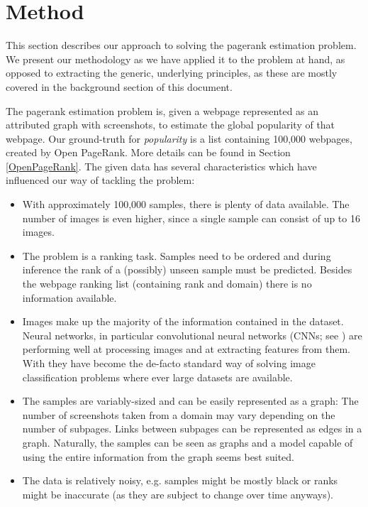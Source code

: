 \section{Method}
\label{sec:method}

This section describes our approach to solving the pagerank estimation problem. We present our methodology as we have applied it to the problem at hand, as opposed to extracting the generic, underlying principles, as these are mostly covered in the background section of this document.

The pagerank estimation problem is, given a webpage represented as an attributed graph with screenshots, to estimate the global popularity of that webpage.
Our ground-truth for \textit{popularity} is a list containing 100,000 webpages, created by Open PageRank.
More details can be found in Section \ref{OpenPageRank}.
The given data has several characteristics which have influenced our way of tackling the problem:

\begin{itemize}
    \item With approximately 100,000 samples, there is plenty of data available. The number of images is even higher, since a single sample can consist of up to 16 images.
    \item The problem is a ranking task. Samples need to be ordered and during inference the rank of a (possibly) unseen sample must be predicted. Besides the webpage ranking list (containing rank and domain) there is no information available.
    \item Images make up the majority of the information contained in the dataset. Neural networks, in particular convolutional neural networks (CNNs; see \cite{lecun1989backpropagation}) are performing well at processing images and at extracting features from them. With \cite{krizhevsky:imagenet} they have become the de-facto standard way of solving image classification problems where ever large datasets are available.
    \item The samples are variably-sized and can be easily represented as a graph: The number of screenshots taken from a domain may vary depending on the number of subpages. Links between subpages can be represented as edges in a graph. Naturally, the samples can be seen as graphs and a model capable of using the entire information from the graph seems best suited.
    \item The data is relatively noisy, e.g. samples might be mostly black or ranks might be inaccurate (as they are subject to change over time anyways).
\end{itemize}

